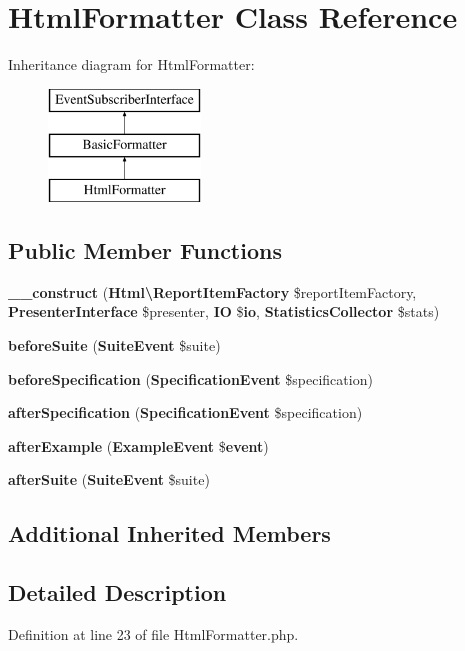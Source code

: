 \section{Html\+Formatter Class Reference}
\label{class_php_spec_1_1_formatter_1_1_html_formatter}
Inheritance diagram for Html\+Formatter\+:\begin{figure}[H]
\begin{center}
\leavevmode
\includegraphics[height=3.000000cm]{class_php_spec_1_1_formatter_1_1_html_formatter}
\end{center}
\end{figure}
\subsection*{Public Member Functions}
\begin{DoxyCompactItemize}
\item 
{\bf \+\_\+\+\_\+construct} ({\bf Html\textbackslash{}\+Report\+Item\+Factory} \$report\+Item\+Factory, {\bf Presenter\+Interface} \$presenter, {\bf I\+O} \${\bf io}, {\bf Statistics\+Collector} \$stats)
\item 
{\bf before\+Suite} ({\bf Suite\+Event} \$suite)
\item 
{\bf before\+Specification} ({\bf Specification\+Event} \$specification)
\item 
{\bf after\+Specification} ({\bf Specification\+Event} \$specification)
\item 
{\bf after\+Example} ({\bf Example\+Event} \${\bf event})
\item 
{\bf after\+Suite} ({\bf Suite\+Event} \$suite)
\end{DoxyCompactItemize}
\subsection*{Additional Inherited Members}


\subsection{Detailed Description}


Definition at line 23 of file Html\+Formatter.\+php.




